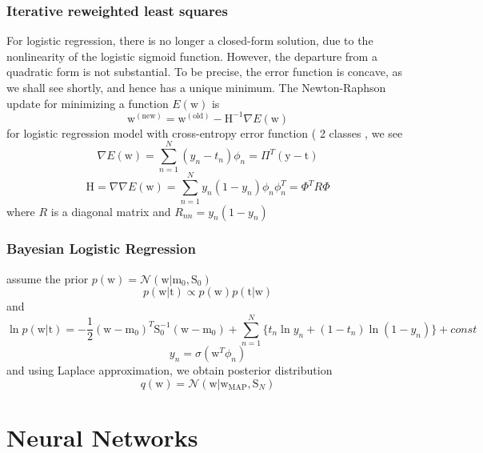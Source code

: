 \documentclass[a4paper]{book}
\begin{document}
\subsubsection{Iterative reweighted least squares }
For logistic regression, there is no longer a closed-form solution, due to the nonlinearity of the logistic sigmoid function. However, the departure from a quadratic form is not substantial. To be precise, the error function is concave, as we shall see shortly, and hence has a unique minimum.\newline
The Newton-Raphson update for minimizing a function $E(\mathrm w)$ is
\begin{equation}
  \mathrm w^{(\mathrm {new})}=\mathrm w^{(\mathrm {old})}-\mathrm H^{-1}\nabla E(\mathrm w)
\end{equation}
for logistic regression model with cross-entropy error function ( 2 classes , we see
$$\nabla E(\mathrm w) = \sum_{n=1}^N(y_n-t_n)\phi_n = \Pi^T(\mathrm y-\mathrm t)$$
$$\mathrm H=\nabla\nabla E(\mathrm w) = \sum_{n=1}^Ny_n(1-y_n)\phi_n\phi_n^T = \Phi^TR\Phi$$
where $R$ is a diagonal matrix and $R_{nn} = y_n(1-y_n)$
\subsubsection{Bayesian Logistic Regression}
assume the prior $p(\mathrm w) = \mathcal N(\mathrm w|\mathrm m_0,\mathrm S_0)$
$$p(\mathrm w|\mathrm t) \propto p(\mathrm w)p(\mathrm t|\mathrm w)$$
and
$$\ln p(\mathrm w|\mathrm t) = -\frac12(\mathrm w-\mathrm m_0)^T\mathrm S_0^{-1}(\mathrm w-\mathrm m_0)+\sum_{n=1}^N\{t_n\ln y_n +(1-t_n)\ln (1-y_n)\} + const$$
$$y_n = \sigma(\mathrm w^T\phi_n)$$
and using Laplace approximation, we obtain posterior distribution
$$q(\mathrm w) = \mathcal N(\mathrm w|\mathrm w_{\mathrm {MAP}}, \mathrm S_N)$$






\section{Neural Networks}
\end{document}
